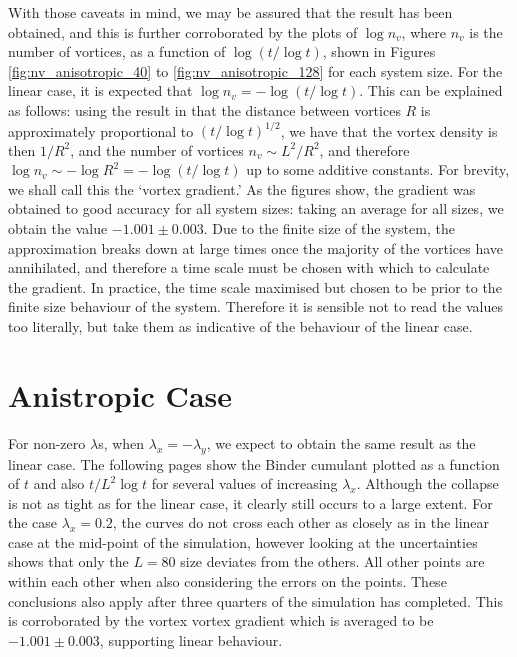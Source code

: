 With those caveats in mind, we may be assured that the result has been obtained, and this is further corroborated by the plots of $\log n_v$, where $n_v$ is the number of vortices, as a function of $\log (t / \log t)$, shown in  Figures \ref{fig:nv_anisotropic_40} to \ref{fig:nv_anisotropic_128}  for each system size. 
For the linear case, it is expected that $\log n_v = -\log (t / \log t)$. 
This can be explained as follows: using the result in \cite{PhysRevLett.84.1503} that the distance between vortices $R$ is approximately proportional to $ (t / \log t)^{1/2}$, we have that the vortex density is then $1/R^2$, and the number of vortices $n_v \sim L^2/R^2$, and therefore $\log n_v \sim -  \log R^2 = -\log(t/\log t)$ up to some additive constants. For brevity, we shall call this the `vortex gradient.'
As the figures show, the gradient was obtained to good accuracy for all system sizes: taking an average for all sizes, we obtain the value $-1.001 \pm 0.003$. Due to the finite size of the system, the approximation breaks down at large times once the majority of the vortices have annihilated, and therefore a time scale must be chosen with which to calculate the gradient. 
In practice, the time scale maximised but chosen to be prior to the finite size behaviour of the system. 
Therefore it is sensible not to read the values too literally, but take them as indicative of the behaviour of the linear case.                



\section{Anistropic Case} 
For non-zero $\lambda$s, when $\lambda_x = - \lambda_y$, we expect to obtain the same result as the linear case. The following pages show the Binder cumulant plotted as a function of $t$ and also $t/ L^2 \log t$ for several values of increasing $\lambda_x$. Although the collapse is not as tight as for the linear case, it clearly still occurs to a large extent. For the case $\lambda_x = 0.2$, the curves do not cross each other as closely as in the linear case at the mid-point of the simulation, however looking at the uncertainties shows that only the $L=80$ size deviates from the others. All other points are within each other when also considering the errors on the points. These conclusions also apply after three quarters of the simulation has completed. This is corroborated by the vortex vortex gradient which is averaged to be $-1.001 \pm 0.003$, supporting linear behaviour.

